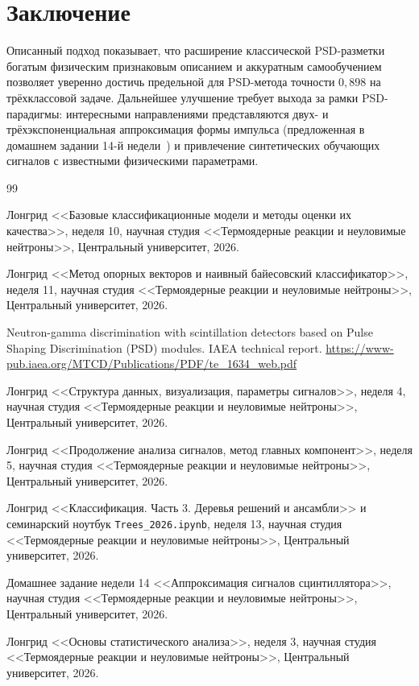 \documentclass[11pt,a4paper]{article}
\begin{document}
\section{Заключение}

Описанный подход показывает, что расширение классической PSD-разметки
богатым физическим признаковым описанием и аккуратным самообучением
позволяет уверенно достичь предельной для PSD-метода точности $0{,}898$
на трёхклассовой задаче. Дальнейшее улучшение требует выхода за рамки
PSD-парадигмы: интересными направлениями представляются двух- и
трёхэкспоненциальная аппроксимация формы импульса (предложенная в
домашнем задании 14-й недели~\cite{hw14}) и привлечение синтетических
обучающих сигналов с известными физическими параметрами.

\begin{thebibliography}{99}

 Лонгрид <<Базовые классификационные модели и методы
оценки их качества>>, неделя 10, научная студия <<Термоядерные
реакции и неуловимые нейтроны>>, Центральный университет, 2026.

 Лонгрид <<Метод опорных векторов и наивный
байесовский классификатор>>, неделя 11, научная студия
<<Термоядерные реакции и неуловимые нейтроны>>, Центральный
университет, 2026.

 Neutron-gamma discrimination with scintillation
detectors based on Pulse Shaping Discrimination (PSD) modules.
IAEA technical report.
\url{https://www-pub.iaea.org/MTCD/Publications/PDF/te_1634_web.pdf}

 Лонгрид <<Структура данных, визуализация, параметры
сигналов>>, неделя 4, научная студия <<Термоядерные реакции и
неуловимые нейтроны>>, Центральный университет, 2026.

 Лонгрид <<Продолжение анализа сигналов, метод главных
компонент>>, неделя 5, научная студия <<Термоядерные реакции и
неуловимые нейтроны>>, Центральный университет, 2026.

 Лонгрид <<Классификация. Часть 3. Деревья решений и
ансамбли>> и семинарский ноутбук \texttt{Trees\_2026.ipynb},
неделя 13, научная студия <<Термоядерные реакции и неуловимые
нейтроны>>, Центральный университет, 2026.

 Домашнее задание недели 14 <<Аппроксимация сигналов
сцинтиллятора>>, научная студия <<Термоядерные реакции и
неуловимые нейтроны>>, Центральный университет, 2026.

 Лонгрид <<Основы статистического анализа>>, неделя 3,
научная студия <<Термоядерные реакции и неуловимые нейтроны>>,
Центральный университет, 2026.

\end{thebibliography}
\end{document}
